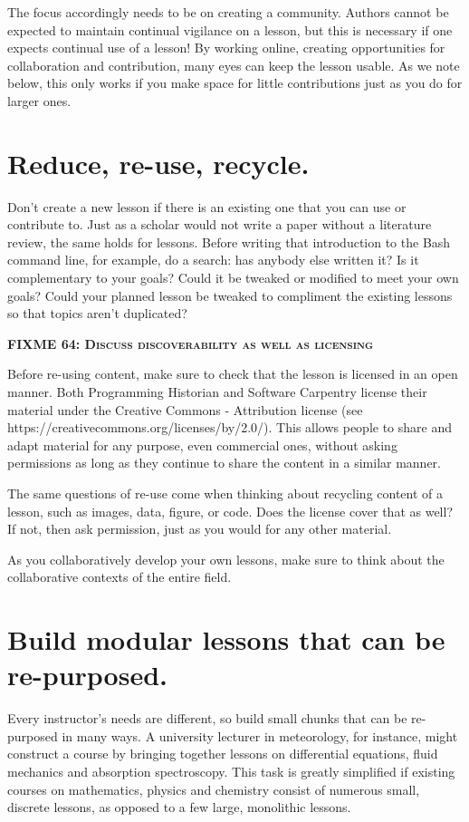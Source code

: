 \documentclass[10pt,letterpaper]{article}
\newcommand{\fixme}[2]{\textsc{\textbf{FIXME {#1}: {#2}}}}
\newcommand{\rulemajor}[1]{\section{#1}}
\begin{document}
The focus accordingly needs to be on creating a community. 
Authors cannot be expected to maintain continual vigilance on a lesson,
but this is necessary if one expects continual use of a lesson! 
By working online, creating opportunities for collaboration 
and contribution, many eyes can keep the lesson usable. 
As we note below, 
this only works if you make space for 
little contributions just as you do for larger ones.

\rulemajor{Reduce, re-use, recycle.}

Don't create a new lesson if there is an existing one that you can use or contribute to.
Just as a scholar would not write a paper without a literature review,
the same holds for lessons.
Before writing that introduction to the Bash command line,
for example,
do a search:
has anybody else written it?
Is it complementary to your goals?
Could it be tweaked or modified to meet your own goals?
Could your planned lesson be tweaked to compliment the existing lessons so that topics aren't duplicated? 

\fixme{64}{Discuss discoverability as well as licensing}

Before re-using content,
make sure to check that the lesson is licensed in an open manner.
Both Programming Historian and Software Carpentry license their material under
the Creative Commons - Attribution license
(see https://creativecommons.org/licenses/by/2.0/).
This allows people to share and adapt material for any purpose,
even commercial ones,
without asking permissions as long as they continue to share the content in a similar manner.

The same questions of re-use come when thinking about recycling content of a lesson,
such as images, data, figure, or code.
Does the license cover that as well?
If not,
then ask permission,
just as you would for any other material.

As you collaboratively develop your own lessons,
make sure to think about the collaborative contexts of the entire field.

\rulemajor{Build modular lessons that can be re-purposed.}

Every instructor's needs are different,
so build small chunks that can be re-purposed in many ways. 
A university lecturer in meteorology, for instance,
might construct a course by bringing together lessons on differential equations,
fluid mechanics and absorption spectroscopy. 
This task is greatly simplified if existing courses on mathematics, 
physics and chemistry consist of numerous small, discrete lessons,
as opposed to a few large, monolithic lessons.
\end{document}
